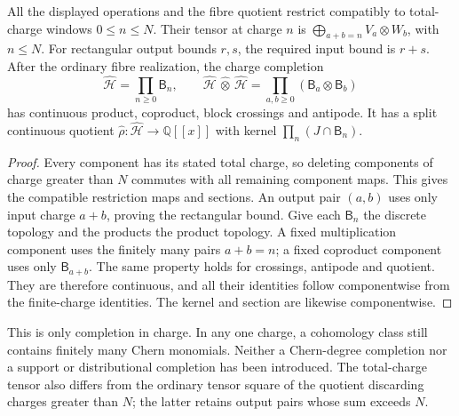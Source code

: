 \begin{corollary}
\label{gh:windows}
All the displayed operations and the fibre quotient restrict
compatibly to total-charge windows $0\leq n\leq N$.
Their tensor at charge $n$ is
$\bigoplus_{a+b=n}V_a\otimes W_b$, with $n\leq N$.
For rectangular output bounds $r,s$, the required input bound is
$r+s$.
After the ordinary fibre realization, the charge completion
\[
 \widehat{\mathcal H}=\prod_{n\geq0}\mathsf B_n,\qquad
 \widehat{\mathcal H}\,\widehat\otimes\,\widehat{\mathcal H}
       =\prod_{a,b\geq0}(\mathsf B_a\otimes\mathsf B_b)
\]
has continuous product, coproduct, block crossings and antipode.
It has a split continuous quotient
$\widehat\rho:\widehat{\mathcal H}\to\mathbb Q[[x]]$ with kernel
$\prod_n(J\cap\mathsf B_n)$.
\end{corollary}
\begin{proof}
Every component has its stated total charge, so deleting components
of charge greater than $N$ commutes with all remaining component
maps. This gives the compatible restriction maps and sections.
An output pair $(a,b)$ uses only input charge $a+b$, proving the
rectangular bound.
Give each $\mathsf B_n$ the discrete topology and the products the
product topology. A fixed multiplication component uses the finitely
many pairs $a+b=n$; a fixed coproduct component uses only
$\mathsf B_{a+b}$. The same property holds for crossings, antipode
and quotient. They are therefore continuous, and all their
identities follow componentwise from the finite-charge identities.
The kernel and section are likewise componentwise.
\end{proof}

This is only completion in charge. In any one charge, a cohomology
class still contains finitely many Chern monomials. Neither a
Chern-degree completion nor a support or distributional completion
has been introduced. The total-charge tensor also differs from the
ordinary tensor square of the quotient discarding charges greater
than $N$; the latter retains output pairs whose sum exceeds $N$.

